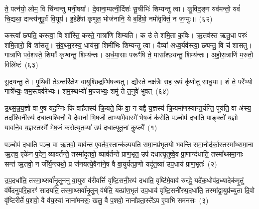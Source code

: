 ते॒ पत्न॑यो॒ लोम॒ वि चि॑न्वन्तु मनी॒षया᳚। दे॒वाना॒म्पत्नी॒र्दिशः॑ सू॒चीभिः॑ शिम्यन्तु त्वा। कु॒विद॒ङ्ग यव॑मन्तो॒ यवं॑ चि॒द्यथा॒ दान्त्य॑नुपू॒र्वं वि॒यूय॑। इ॒हेहै॑षां कृणुत॒ भोज॑नानि॒ ये ब॒र्\mbox{}हिषो॒ नमो॑वृक्तिं॒ न ज॒ग्मुः॥~(६२)

{\anuvakamend[{नारी᳚स्त्रि॒ꣳ॒शच्च॑}]}%

कस्त्वा᳚ छ्यति॒ कस्त्वा॒ वि शा᳚स्ति॒ कस्ते॒ गात्रा॑णि शिम्यति। क उ॑ ते शमि॒ता क॒विः। ऋ॒तव॑स्त ऋतु॒धा परुः॑ शमि॒तारो॒ वि शा॑सतु। सं॒व॒थ्स॒रस्य॒ धाय॑सा॒ शिमी॑भिः शिम्यन्तु त्वा। दैव्या॑ अध्व॒र्यव॑स्त्वा॒ छ्यन्तु॒ वि च॑ शासतु। गात्रा॑णि पर्व॒शस्ते॒ शिमाः᳚ कृण्वन्तु॒ शिम्य॑न्तः। अ॒र्ध॒मा॒साः परूꣳ॑षि ते॒ मासा᳚श्छ्यन्तु॒ शिम्य॑न्तः। अ॒हो॒रा॒त्राणि॑ म॒रुतो॒ विलि॑ष्टं~(६३)

सू॒द॒य॒न्तु॒ ते॒। पृ॒थि॒वी ते॒\-ऽन्तरि॑क्षेण वा॒युश्छि॒द्रम्भि॑षज्यतु। द्यौस्ते॒ नक्ष॑त्रैः स॒ह रू॒पं कृ॑णोतु साधु॒या। शं ते॒ परे᳚भ्यो॒ गात्रे᳚भ्यः॒ शम॒स्त्वव॑रेभ्यः। शम॒स्थभ्यो॑ म॒ज्जभ्यः॒ शमु॑ ते त॒नुवे॑ भुवत्~(६४)


{\anuvakamend[{विलि॑ष्टन्त्रि॒ꣳ॒शच्च॑}]}%

{\anuvakamend[{उ॒थ्स॒न्न॒य॒ज्ञ इन्द्रा᳚ग्नी दे॒वा वा अ॑क्षणयास्तो॒मीया॑ अ॒ग्नेर्भा॒गो᳚\-ऽस्यग्ने॑ जा॒तान्र॒श्मिरिति॑ नाक॒सद्भि॒श्छन्दाꣳ॑सि॒ सर्वा᳚भ्यो वृष्टि॒सनी᳚र्देवासु॒राः कनी॑याꣳसः प्र॒जाप॑ते॒रक्षि॒ द्वाद॑श}]}%

\setcounter{anuvakam}{0}
उ॒थ्स॒न्न॒य॒ज्ञो वा ए॒ष यद॒ग्निः किं वाहै॒तस्य॑ क्रि॒यते॒ किं वा॒ न यद्वै य॒ज्ञस्य॑ क्रि॒यमा॑णस्यान्त॒र्यन्ति॒ पूय॑ति॒ वा अ॑स्य॒ तदा᳚श्वि॒नीरुप॑ दधात्य॒श्विनौ॒ वै दे॒वानां᳚ भि॒षजौ॒ ताभ्या॑मे॒वास्मै॑ भेष॒जं क॑रोति॒ पञ्चोप॑ दधाति॒ पाङ्क्तो॑ य॒ज्ञो यावा॑ने॒व य॒ज्ञस्तस्मै॑ भेष॒जं क॑रोत्यृत॒व्या॑ उप॑ दधात्यृतू॒नां कॢप्त्यै᳚~(१)

पञ्चोप॑ दधाति पञ्च॒ वा ऋ॒तवो॒ याव॑न्त ए॒वर्तव॒स्तान्क॑ल्पयति समा॒नप्र॑भृतयो भवन्ति समा॒नोद॑र्का॒स्तस्मा᳚थ्समा॒ना ऋ॒तव॒ एके॑न प॒देन॒ व्याव॑र्तन्ते॒ तस्मा॑दृ॒तवो॒ व्याव॑र्तन्ते प्राण॒भृत॒ उप॑ दधात्यृ॒तुष्वे॒व प्रा॒णान्द॑धाति॒ तस्मा᳚थ्समा॒नाः सन्त॑ ऋ॒तवो॒ न जी᳚र्य॒न्त्यथो॒ प्र ज॑नयत्ये॒वैना॑ने॒ष वै वा॒युर्यत्प्रा॒णो यदृ॑त॒व्या॑ उप॒धाय॑ प्राण॒भृतः॑~(२)

उ॒प॒दधा॑ति॒ तस्मा॒थ्सर्वा॑नृ॒तूननु॑ वा॒युरा व॑रीवर्त्ति वृष्टि॒सनी॒रुप॑ दधाति॒ वृष्टि॑मे॒वाव॑ रुन्द्धे॒ यदे॑क॒धोप॑द॒ध्यादेक॑मृ॒तुं व॑र्\mbox{}षेदनुपरि॒हारꣳ॑ सादयति॒ तस्मा॒थ्सर्वा॑नृ॒तून् व॑र्\mbox{}षति॒ यत्प्रा॑ण॒भृत॑ उप॒धाय॑ वृष्टि॒सनी॑रुप॒दधा॑ति॒ तस्मा᳚द्वा॒युप्र॑च्युता दि॒वो वृ॑ष्टिरीर्ते प॒शवो॒ वै व॑य॒स्या॑ नाना॑मनसः॒ खलु॒ वै प॒शवो॒ नाना᳚व्रता॒स्ते॑\-ऽप ए॒वाभि सम॑नसः~(३)

